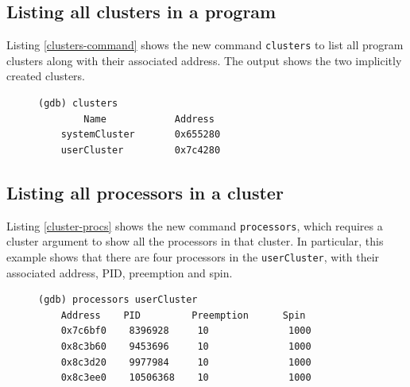 \subsection{Listing all clusters in a \uCPPS program}
Listing \ref{clusters-command} shows the new command \verb|clusters| to list
all program clusters along with their associated address.  The output shows the
two \uCPPS implicitly created clusters.
\begin{figure}
\begin{lstlisting}[caption={clusters command}, label={clusters-command}, basicstyle=\small\tt]
(gdb) clusters
        Name            Address
    systemCluster       0x655280
    userCluster         0x7c4280
\end{lstlisting}
\end{figure}

\subsection{Listing all processors in a cluster}
Listing \ref{cluster-procs} shows the new command \verb|processors|, which
requires a cluster argument to show all the processors in that cluster. In
particular, this example shows that there are four processors in the
\verb|userCluster|, with their associated address, PID, preemption and spin.
\begin{figure}
\begin{lstlisting}[caption={processors command}, label={cluster-procs}, basicstyle=\small\tt]
(gdb) processors userCluster
    Address    PID         Preemption      Spin
    0x7c6bf0    8396928     10              1000
    0x8c3b60    9453696     10              1000
    0x8c3d20    9977984     10              1000
    0x8c3ee0    10506368    10              1000
\end{lstlisting}
\end{figure}

